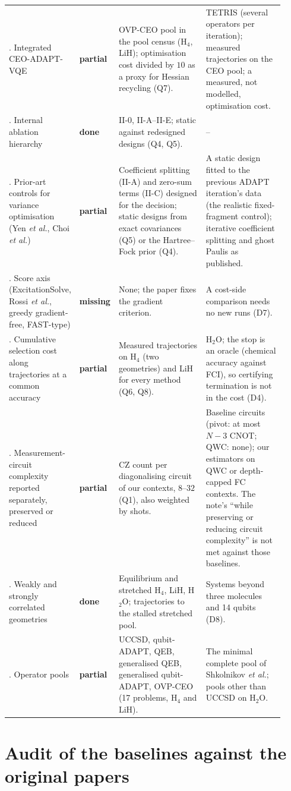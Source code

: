 \documentclass[11pt]{article}
\newcommand{\stDone}{\textcolor{green!40!black}{\textbf{done}}}
\newcommand{\stPart}{\textcolor{orange!80!black}{\textbf{partial}}}
\newcommand{\stMiss}{\textcolor{red!70!black}{\textbf{missing}}}
\newcommand{\Hfour}{H$_4$}
\newcommand{\Htwo}{H$_2$O}
\begin{document}
\begin{longtable}{>{\raggedright\arraybackslash}p{0.19\linewidth}>{\raggedright\arraybackslash}p{0.07\linewidth}>{\raggedright\arraybackslash}p{0.35\linewidth}>{\raggedright\arraybackslash}p{0.31\linewidth}}
6. Integrated CEO-ADAPT-VQE & \stPart & OVP-CEO pool in the pool census (\Hfour{}, LiH); optimisation cost divided by $10$ as a proxy for Hessian recycling (Q7). & TETRIS (several operators per iteration); measured trajectories on the CEO pool; a measured, not modelled, optimisation cost. \\
7. Internal ablation hierarchy & \stDone & II-0, II-A--II-E; static against redesigned designs (Q4, Q5). & -- \\
8. Prior-art controls for variance optimisation (Yen \emph{et al.}, Choi \emph{et al.}) & \stPart & Coefficient splitting (II-A) and zero-sum terms (II-C) designed for the decision; static designs from exact covariances (Q5) or the Hartree--Fock prior (Q4). & A static design fitted to the previous ADAPT iteration's data (the realistic fixed-fragment control); iterative coefficient splitting and ghost Paulis as published. \\
9. Score axis (ExcitationSolve, Rossi \emph{et al.}, greedy gradient-free, FAST-type) & \stMiss & None; the paper fixes the gradient criterion. & A cost-side comparison needs no new runs (D7). \\
10. Cumulative selection cost along trajectories at a common accuracy & \stPart & Measured trajectories on \Hfour{} (two geometries) and LiH for every method (Q6, Q8). & \Htwo{}; the stop is an oracle (chemical accuracy against FCI), so certifying termination is not in the cost (D4). \\
11. Measurement-circuit complexity reported separately, preserved or reduced & \stPart & CZ count per diagonalising circuit of our contexts, $8$--$32$ (Q1), also weighted by shots. & Baseline circuits (pivot: at most $N-3$ CNOT; QWC: none); our estimators on QWC or depth-capped FC contexts. The note's ``while preserving or reducing circuit complexity'' is not met against those baselines. \\
12. Weakly and strongly correlated geometries & \stDone & Equilibrium and stretched \Hfour{}, LiH, \Htwo{}; trajectories to the stalled stretched pool. & Systems beyond three molecules and 14 qubits (D8). \\
13. Operator pools & \stPart & UCCSD, qubit-ADAPT, QEB, generalised QEB, generalised qubit-ADAPT, OVP-CEO (17 problems, \Hfour{} and LiH). & The minimal complete pool of Shkolnikov \emph{et al.}; pools other than UCCSD on \Htwo{}. \\
\bottomrule
\end{longtable}
\endgroup

\section{Audit of the baselines against the original papers}
\label{sec:audit}
\end{document}
